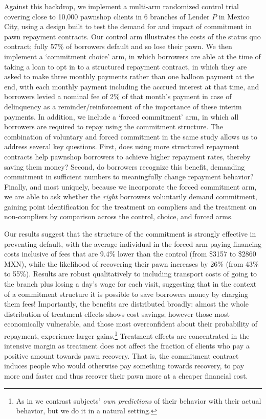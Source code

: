 \documentclass[oneside,11pt]{article}
\begin{document}
Against this backdrop, we implement a multi-arm randomized control trial covering close to 10,000 pawnshop clients in 6 branches of Lender $P$ in Mexico City, using a design built to test the demand for and impact of commitment in pawn repayment contracts.  Our control arm illustrates the costs of the status quo contract; fully 57\% of borrowers default and so lose their pawn.  We then implement a `commitment choice’ arm, in which borrowers are able at the time of taking a loan to opt in to a structured repayment contract, in which they are asked to make three monthly payments rather than one balloon payment at the end, with each monthly payment including the accrued interest at that time, and borrowers levied a nominal fee of 2\% of that month's payment in case of delinquency as a reminder/reinforcement of the importance of these interim payments.  In addition, we include a `forced commitment’ arm, in which all borrowers are required to repay using the commitment structure.  The combination of voluntary and forced commitment in the same study allows us to address several key questions.  First, does using more structured repayment contracts help pawnshop borrowers to achieve higher repayment rates, thereby saving them money?  Second, do borrowers recognize this benefit, demanding commitment in sufficient numbers to meaningfully change repayment behavior?  Finally, and most uniquely, because we incorporate the forced commitment arm, we are able to ask whether the \textit{right} borrowers voluntarily demand commitment, gaining point identification for the treatment on compliers and the treatment on non-compliers by comparison across the control, choice, and forced arms. 
	
Our results suggest that the structure of the commitment is strongly effective in preventing default, with the average individual in the forced arm paying financing costs inclusive of fees that are 9.4\% lower than the control (from \$3157 to \$2860 MXN), while the likelihood of recovering their pawn increases by 26\% (from 43\% to 55\%).  Results are robust qualitatively to including transport costs of going to the branch plus losing a day's wage for each visit, suggesting that in the context of a commitment structure it is possible to save borrowers money by charging them fees!  Importantly, the benefits are distributed broadly: almost the whole distribution of treatment effects shows cost savings; however those most economically vulnerable, and those most overconfident about their probability of repayment, experience larger gains.\footnote{As in \cite{Rabin2018} we contrast subjects' \textit{own predictions} of their behavior with their actual behavior, but we do it in a natural setting.}  Treatment effects are concentrated in the intensive margin as treatment does not affect the fraction of clients who pay a positive amount towards pawn recovery. That is, the commitment contract induces people who would otherwise pay something towards recovery, to pay more and faster and thus recover their pawn more at a cheaper financial cost.  
\end{document}
